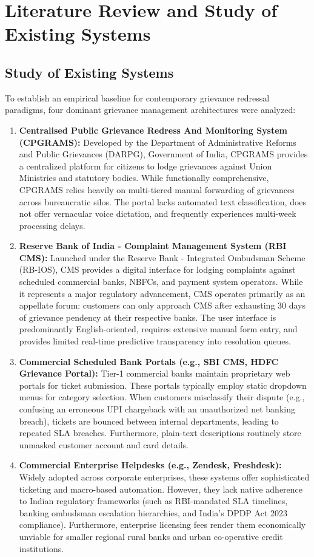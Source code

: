 \chapter{Literature Review and Study of Existing Systems}

\section{Study of Existing Systems}
To establish an empirical baseline for contemporary grievance redressal paradigms, four dominant grievance management architectures were analyzed:
\begin{enumerate}
    \item \textbf{Centralised Public Grievance Redress And Monitoring System (CPGRAMS):} Developed by the Department of Administrative Reforms and Public Grievances (DARPG), Government of India, CPGRAMS provides a centralized platform for citizens to lodge grievances against Union Ministries and statutory bodies. While functionally comprehensive, CPGRAMS relies heavily on multi-tiered manual forwarding of grievances across bureaucratic silos. The portal lacks automated text classification, does not offer vernacular voice dictation, and frequently experiences multi-week processing delays.
    \item \textbf{Reserve Bank of India - Complaint Management System (RBI CMS):} Launched under the Reserve Bank - Integrated Ombudsman Scheme (RB-IOS), CMS provides a digital interface for lodging complaints against scheduled commercial banks, NBFCs, and payment system operators. While it represents a major regulatory advancement, CMS operates primarily as an appellate forum: customers can only approach CMS after exhausting 30 days of grievance pendency at their respective banks. The user interface is predominantly English-oriented, requires extensive manual form entry, and provides limited real-time predictive transparency into resolution queues.
    \item \textbf{Commercial Scheduled Bank Portals (e.g., SBI CMS, HDFC Grievance Portal):} Tier-1 commercial banks maintain proprietary web portals for ticket submission. These portals typically employ static dropdown menus for category selection. When customers misclassify their dispute (e.g., confusing an erroneous UPI chargeback with an unauthorized net banking breach), tickets are bounced between internal departments, leading to repeated SLA breaches. Furthermore, plain-text descriptions routinely store unmasked customer account and card details.
    \item \textbf{Commercial Enterprise Helpdesks (e.g., Zendesk, Freshdesk):} Widely adopted across corporate enterprises, these systems offer sophisticated ticketing and macro-based automation. However, they lack native adherence to Indian regulatory frameworks (such as RBI-mandated SLA timelines, banking ombudsman escalation hierarchies, and India's DPDP Act 2023 compliance). Furthermore, enterprise licensing fees render them economically unviable for smaller regional rural banks and urban co-operative credit institutions.
\end{enumerate}

